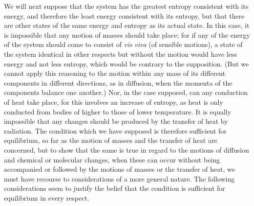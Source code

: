\documentclass[12pt]{memoir}
\begin{document}
We will next suppose that the system has the greatest entropy consistent with its energy, and therefore the least energy consistent with its entropy, but that there are other states of the same energy and entropy as its actual state. In this case, it is impossible that any motion of masses should take place; for if any of the energy of the system should come to consist of \textit{vis viva} (of sensible motions), a state of the system identical in other respects but without the motion would have less energy and not less entropy, which would be contrary to the supposition. (But we cannot apply this reasoning to the motion within any mass of its different components in different directions, as in diffusion, when the momenta of the components balance one another.) Nor, in the case supposed, can any conduction of heat take place, for this involves an increase of entropy, as heat is only conducted from bodies of higher to those of lower temperature. It is equally impossible that any changes should be produced by the transfer of heat by radiation. The condition which we have supposed is therefore sufficient for equilibrium, so far as the motion of masses and the transfer of heat are concerned, but to show that the same is true in regard to the motions of diffusion and chemical or molecular changes, when these can occur without being accompanied or followed by the motions of masses or the transfer of heat, we must have recourse to considerations of a more general nature. The following considerations seem to justify the belief that the condition is sufficient for equilibrium in every respect.
\end{document}
